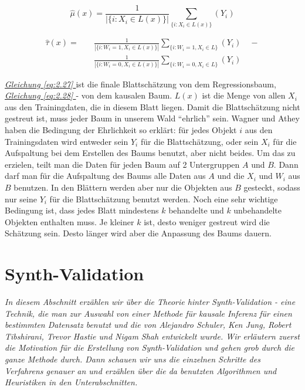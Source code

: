\documentclass[12pt,a4paper,twoside]{scrartcl}
\numberwithin{equation}{section}
\renewcommand*{\refeq}[1]{\emph{\hyperref[#1]{Gleichung \ref*{#1} }}}
\begin{document}
\begin{equation}\label{eq:2.27}
	\hat \mu(x) = \frac{1}{|\{i : X_i \in L(x)\}|}\sum_{\{i : X_i \in L(x)\}}(Y_i)
\end{equation} 

\begin{equation}\label{eq:2.28}
\begin{split}
	\hat \tau(x) = \quad&\frac{1}{|\{i : W_i = 1,X_i \in L(x)\}|}\sum_{\{i : W_i = 1,X_i \in L\}}(Y_i)\quad - \\ 
	&\frac{1}{|\{i : W_i = 0,X_i \in L(x)\}|}\sum_{\{i : W_i = 0,X_i \in L\}}(Y_i)
\end{split}
\end{equation} 

\noindent
\refeq{eq:2.27} ist die finale Blattschätzung von dem Regressionsbaum, \refeq{eq:2.28} - von dem kausalen Baum. $L(x)$ ist die Menge von allen $X_i$ aus den Trainingdaten, die in diesem Blatt liegen. Damit die Blattschätzung nicht gestreut ist, muss jeder Baum in unserem Wald \enquote{ehrlich} sein. Wagner und Athey\cite{wager2018estimation} haben die Bedingung der Ehrlichkeit so erklärt: für jedes Objekt $i$ aus den Trainingsdaten wird entweder sein $Y_i$ für die Blattschätzung, oder sein $X_i$ für die Aufspaltung bei dem Erstellen des Baums benutzt, aber nicht beides. Um das zu erzielen, teilt man die Daten für jeden Baum auf 2 Untergruppen $A$ und $B$. Dann darf man für die Aufspaltung des Baums alle Daten aus $A$ und die $X_i$ und $W_i$ aus $B$ benutzen. In den Blättern werden aber nur die Objekten aus $B$ gesteckt, sodass nur seine $Y_i$ für die Blattschätzung benutzt werden. Noch eine sehr wichtige Bedingung ist, dass jedes Blatt mindestens $k$ behandelte und $k$ unbehandelte Objekten enthalten muss. Je kleiner $k$ ist, desto weniger gestreut wird die Schätzung sein. Desto länger wird aber die Anpassung des Baums dauern\cite{wager2018estimation}.   

\clearpage

\section{Synth-Validation}\label{sec:synthValidation}

\noindent
\emph{In diesem Abschnitt erzählen wir über die Theorie hinter Synth-Validation - eine Technik, die man zur Auswahl von einer Methode für kausale Inferenz für einen bestimmten Datensatz benutzt und die von Alejandro Schuler, Ken Jung, Robert Tibshirani, Trevor Hastie und Nigam Shah entwickelt wurde\cite{schuler2017synth}. Wir erläutern zuerst die Motivation für die Erstellung von Synth-Validation und gehen grob durch die ganze Methode durch. Dann schauen wir uns die einzelnen Schritte des Verfahrens genauer an und erzählen über die da benutzten Algorithmen und Heuristiken in den Unterabschnitten.}\par
\end{document}
